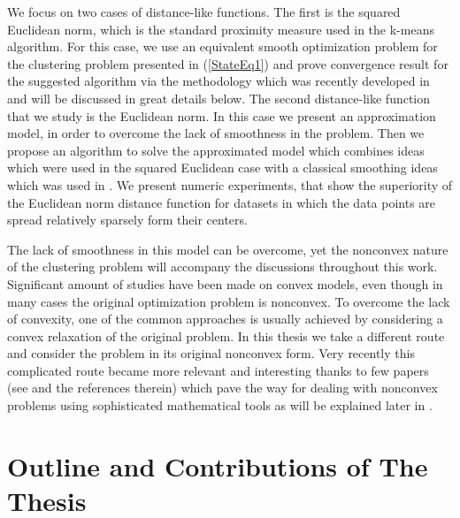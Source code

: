 We focus on two cases of distance-like functions. The first is the squared Euclidean norm, which is the standard proximity measure used in the k-means algorithm. For this case, we use an equivalent smooth optimization problem for the clustering problem presented in (\ref{StateEq1}) and prove convergence result for the suggested algorithm via the methodology which was recently developed in \cite{BST2014} and will be discussed in great details below. The second distance-like function that we study is the Euclidean norm. In this case we present an approximation model, in order to overcome the lack of smoothness in the problem. Then we propose an algorithm to solve the approximated model which combines ideas which were used in the squared Euclidean case with a classical smoothing ideas which was used in \cite{BS2015}. We present numeric experiments, that show the superiority of the Euclidean norm distance function for datasets in which the data points are spread relatively sparsely form their centers. \medskip

The lack of smoothness in this model can be overcome, yet the nonconvex nature of the clustering problem will accompany the discussions throughout this work. Significant amount of studies have been made on convex models, even though in many cases the original optimization problem is nonconvex. To overcome the lack of convexity, one of the common approaches is usually achieved by considering a convex relaxation of the original problem. In this thesis we take a different route and consider the problem in its original nonconvex form. Very recently this complicated route became more relevant and interesting thanks to few papers (see \cite{AB2009,ABS2013,BST2014} and the references therein) which pave the way for dealing with nonconvex problems using sophisticated mathematical tools as will be explained later in .


\section{Outline and Contributions of The Thesis}

